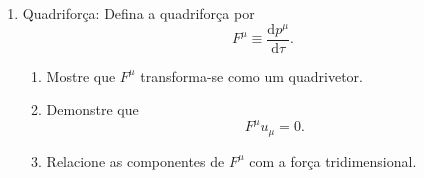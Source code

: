 \begin{enumerate}
            \begin{enumerate}
                  \item Considere uma partícula de massa $m$ e velocidade $\mathbf{v}$.
                        Utilizando a definição do quadrimomento
                        $$
                              p^\mu = mc\,u^\mu,
                        $$
                        mostre que sua componente temporal pode ser escrita como
                        $$
                              p^0 = \gamma mc.
                        $$

                  \item Definindo a energia relativística por
                        $$
                              E \equiv cp^0,
                        $$
                        demonstre que
                        $$
                              E = \gamma mc^2.
                        $$

                  \item Utilizando a relação
                        $$
                              p = \gamma mv,
                        $$
                        elimine $\gamma$ e obtenha a expressão
                        $$
                              E^2 = p^2c^2 + m^2c^4.
                        $$

                  \item Mostre que, no limite $v \ll c$,
                        $$
                              E \simeq mc^2 + \frac12 mv^2.
                        $$
                        Interprete fisicamente os dois termos desta expressão.
            \end{enumerate}

      \item Quadriforça: Defina a quadriforça por
            $$
                  F^\mu\equiv\frac{\mathrm d p^\mu}{\mathrm d\tau}.
            $$

            \begin{enumerate}
                  \item Mostre que $F^\mu$ transforma-se como um quadrivetor.

                  \item Demonstre que
                        $$
                              F^\mu u_\mu=0.
                        $$

                  \item Relacione as componentes de $F^\mu$ com a força
                        tridimensional.
            \end{enumerate}


\end{enumerate}
